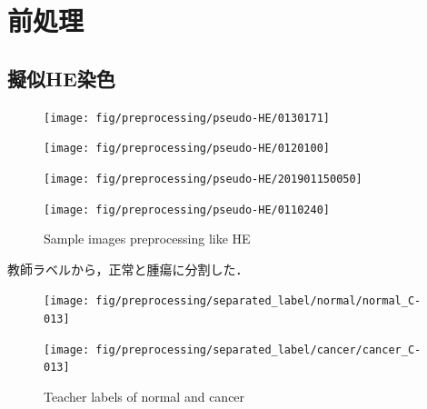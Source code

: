 \section{前処理}

\subsection{擬似HE染色}
\begin{figure}[H]
	\centering
	
	\begin{minipage}{0.8\columnwidth}
		\centering
		\texttt{[image: fig/preprocessing/pseudo-HE/0130171]}
	\end{minipage}
	\begin{minipage}{0.8\columnwidth}
		\centering
		\texttt{[image: fig/preprocessing/pseudo-HE/0120100]}
	\end{minipage}
	\begin{minipage}{0.8\columnwidth}
		\centering
		\texttt{[image: fig/preprocessing/pseudo-HE/201901150050]}
	\end{minipage}
	\begin{minipage}{0.8\columnwidth}
		\centering
		\texttt{[image: fig/preprocessing/pseudo-HE/0110240]}
	\end{minipage}
	
	
	\caption{Sample images preprocessing like HE}
	\label{fig:HElike}
	
\end{figure}


教師ラベルから，正常と腫瘍に分割した．
\begin{figure}[H]
	\centering
	
	\begin{minipage}{0.4\columnwidth}
		\centering
		\texttt{[image: fig/preprocessing/separated\_label/normal/normal\_C-013]}
	\end{minipage}
	\begin{minipage}{0.4\columnwidth}
		\centering
		\texttt{[image: fig/preprocessing/separated\_label/cancer/cancer\_C-013]}
	\end{minipage}
	
	\caption{Teacher labels of normal and cancer}
	\label{fig:検体A教師ラベル}
	
\end{figure}

